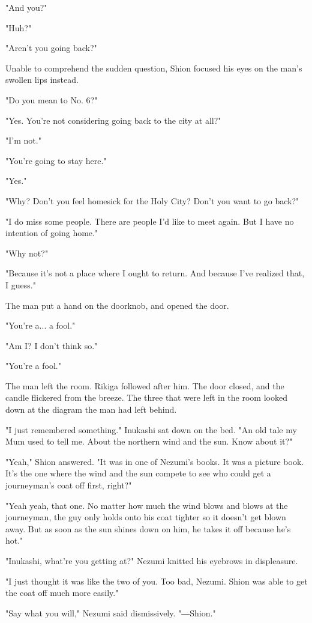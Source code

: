 "And you?"

"Huh?"

"Aren't you going back?"

Unable to comprehend the sudden question, Shion focused his eyes on the
man's swollen lips instead.

"Do you mean to No. 6?"

"Yes. You're not considering going back to the city at all?"

"I'm not."

"You're going to stay here."

"Yes."

"Why? Don't you feel homesick for the Holy City? Don't you want to go
back?"

"I do miss some people. There are people I'd like to meet again. But I
have no intention of going home."

"Why not?"

"Because it's not a place where I ought to return. And because I've
realized that, I guess."

The man put a hand on the doorknob, and opened the door.

"You're a... a fool."

"Am I? I don't think so."

"You're a fool."

The man left the room. Rikiga followed after him. The door closed, and
the candle flickered from the breeze. The three that were left in the
room looked down at the diagram the man had left behind.

"I just remembered something." Inukashi sat down on the bed. "An old
tale my Mum used to tell me. About the northern wind and the sun. Know
about it?"

"Yeah," Shion answered. "It was in one of Nezumi's books. It was a
picture book. It's the one where the wind and the sun compete to see who
could get a journeyman's coat off first, right?"

"Yeah yeah, that one. No matter how much the wind blows and blows at the
journeyman, the guy only holds onto his coat tighter so it doesn't get
blown away. But as soon as the sun shines down on him, he takes it off
because he's hot."

"Inukashi, what're you getting at?" Nezumi knitted his eyebrows in
displeasure.

"I just thought it was like the two of you. Too bad, Nezumi. Shion was
able to get the coat off much more easily."

"Say what you will," Nezumi said dismissively. "―Shion."

